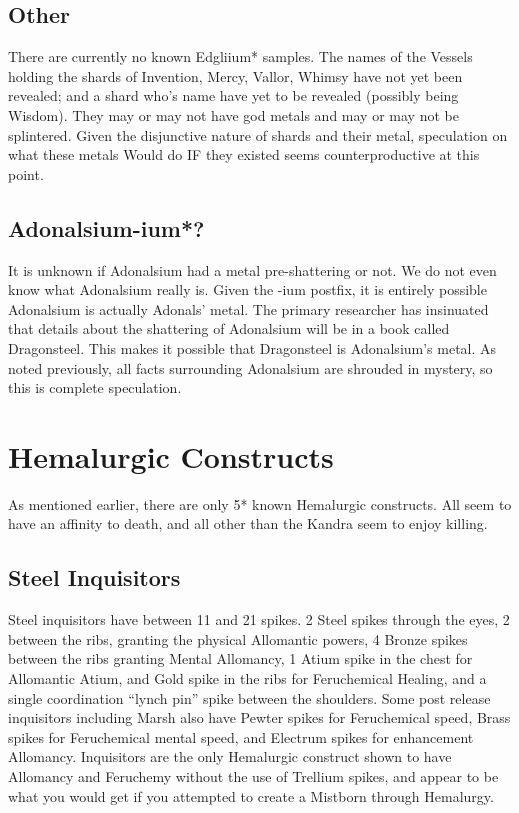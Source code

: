 \documentclass[conference]{IEEEtran}
\newcommand{\n}{\hfill\break}
\begin{document}
\subsection*{\textbf{Other}}
There are currently no known Edgliium* samples.
The names of the Vessels holding the shards of Invention, Mercy, Vallor, Whimsy have not yet been revealed; and a shard who's name have yet to be revealed (possibly being Wisdom).  They may or may not have god metals and may or may not be splintered.  Given the disjunctive nature of shards and their metal, speculation on what these metals Would do IF they existed seems counterproductive at this point.  
\n
\subsection*{\textbf{Adonalsium-ium}*?}
It is unknown if Adonalsium had a metal pre-shattering or not.  We do not even know what Adonalsium really is.  Given the -ium postfix, it is entirely possible Adonalsium is actually Adonals' metal.  The primary researcher has insinuated that details about the shattering of Adonalsium will be in a book called Dragonsteel.  This makes it possible that Dragonsteel is Adonalsium's metal.
As noted previously, all facts surrounding Adonalsium are shrouded in mystery, so this is complete speculation.
\\

\section{\textbf{Hemalurgic Constructs}}
As mentioned earlier, there are only 5* known Hemalurgic constructs.  All seem to have an affinity to death,\cite{WoA-CH19}\cite{WoF}\cite{HoA-CH69}\cite{SoS-CH21}\cite{TFE-EP}\cite{WoA-CH11}\cite{TFE-CH34} and all other than the Kandra seem to enjoy killing.\cite{HoA-CH11}
\subsection*{\textbf{Steel Inquisitors}}
Steel inquisitors have between 11 and 21 spikes.\cite{TFE-EP}\cite{HoA-CH13}  2 Steel spikes through the eyes,\cite{TFE-CH2} 2 between the ribs, granting the physical Allomantic powers,\cite{HoA-CH5} 4 Bronze spikes between the ribs granting Mental Allomancy,\cite{HoA-CH13} 1 Atium spike in the chest for Allomantic Atium, and Gold spike in the ribs for Feruchemical Healing,\cite{HoA-CH72} and a single coordination ``lynch pin'' spike between the shoulders.\cite{TFE-CH38}\cite{ARS-TLM} Some post release inquisitors including Marsh also have Pewter spikes for Feruchemical speed,\cite{HoA-CH5} Brass spikes for Feruchemical mental speed,\cite{IN-Ms} and Electrum spikes for enhancement Allomancy.\cite{HoA-CH72}  Inquisitors are the only Hemalurgic construct shown to have Allomancy and Feruchemy without the use of Trellium spikes, and appear to be what you would get if you attempted to create a Mistborn through Hemalurgy.
\end{document}
